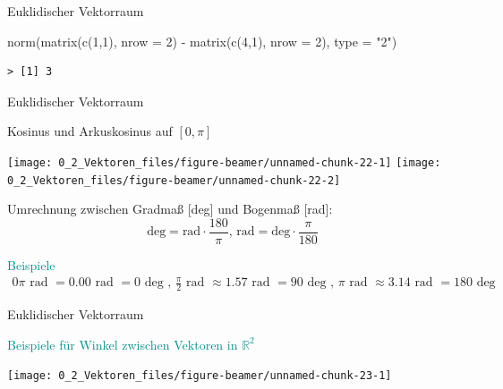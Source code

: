 \documentclass[
  8pt,
  ignorenonframetext,
]{beamer}
\newenvironment{Shaded}{\begin{snugshade}}{\end{snugshade}}
\newcommand{\AttributeTok}[1]{\textcolor[rgb]{0.77,0.63,0.00}{#1}}
\newcommand{\DecValTok}[1]{\textcolor[rgb]{0.00,0.00,0.81}{#1}}
\newcommand{\FunctionTok}[1]{\textcolor[rgb]{0.00,0.00,0.00}{#1}}
\newcommand{\NormalTok}[1]{#1}
\newcommand{\SpecialCharTok}[1]{\textcolor[rgb]{0.00,0.00,0.00}{#1}}
\newcommand{\StringTok}[1]{\textcolor[rgb]{0.31,0.60,0.02}{#1}}
\begin{document}
\begin{frame}[fragile]{Euklidischer Vektorraum}
\begin{Shaded}
\begin{Highlighting}[]
\FunctionTok{norm}\NormalTok{(}\FunctionTok{matrix}\NormalTok{(}\FunctionTok{c}\NormalTok{(}\DecValTok{1}\NormalTok{,}\DecValTok{1}\NormalTok{), }\AttributeTok{nrow =} \DecValTok{2}\NormalTok{) }\SpecialCharTok{{-}} \FunctionTok{matrix}\NormalTok{(}\FunctionTok{c}\NormalTok{(}\DecValTok{4}\NormalTok{,}\DecValTok{1}\NormalTok{), }\AttributeTok{nrow =} \DecValTok{2}\NormalTok{), }\AttributeTok{type =} \StringTok{"2"}\NormalTok{)}
\end{Highlighting}
\end{Shaded}

\begin{verbatim}
> [1] 3
\end{verbatim}
\end{frame}

\begin{frame}{Euklidischer Vektorraum}
\protect\hypertarget{euklidischer-vektorraum-8}{}
\vspace{3mm}

Kosinus und Arkuskosinus auf \([0,\pi]\)  \vspace{6pt}

\begin{center}\texttt{[image: 0\_2\_Vektoren\_files/figure-beamer/unnamed-chunk-22-1]} \texttt{[image: 0\_2\_Vektoren\_files/figure-beamer/unnamed-chunk-22-2]} \end{center}
\small
\vspace{5pt}

Umrechnung zwischen Gradmaß {[}deg{]} und Bogenmaß {[}rad{]}:
\vspace{3pt} \footnotesize \begin{equation}
\mbox{deg} = \mbox{rad} \cdot \frac{180}{\pi}, \,
\mbox{rad} = \mbox{deg} \cdot \frac{\pi}{180}
\end{equation}

\small

\textcolor{darkcyan}{Beispiele} \footnotesize \begin{align*}
0\pi \mbox{ rad }                 = 0.00 \mbox{ rad } = 0  \mbox{ deg }, \,
\frac{\pi}{2} \mbox{ rad } \approx  1.57 \mbox{ rad } = 90 \mbox{ deg }, \,
\pi \mbox{ rad } \approx  3.14 \mbox{ rad } = 180 \mbox{ deg }
\end{align*}
\end{frame}

\begin{frame}{Euklidischer Vektorraum}
\protect\hypertarget{euklidischer-vektorraum-9}{}
\vspace{3mm}

\textcolor{darkcyan}{Beispiele für Winkel zwischen Vektoren in $\mathbb{R}^2$}

\vspace{6pt}

\begin{center}\texttt{[image: 0\_2\_Vektoren\_files/figure-beamer/unnamed-chunk-23-1]} \end{center}
\end{frame}
\end{document}

